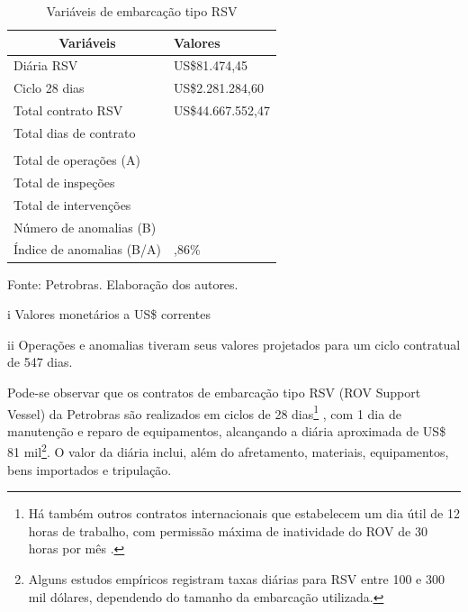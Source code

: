 \begin{table}[h]
	\centering
	\begin{threeparttable}
	\centering
	\caption{Variáveis de embarcação tipo RSV}
	\label{tab:cost1}
	\begin{tabular}{p{8cm} >{\centering\arraybackslash}m{3.7cm}}
		\hline
		\multicolumn{1}{c}{\textbf{Variáveis}} & \textbf{Valores}\tnote{i}  \\ \hline
		Diária RSV                              & US\$81.474,45     \\
		Ciclo 28 dias                          & US\$2.281.284,60  \\
		Total contrato RSV                     & US\$44.667.552,47 \\
		Total dias de contrato                 & 547               \\
		                                       &                   \\
		Total de operações (A)\tnote{ii}       & 1976              \\
		Total de inspeções                     & 1337              \\
		Total de intervenções                  & 639               \\
		Número de anomalias (B)                & 432               \\
		Índice de anomalias (B/A)              & 21,86\%           \\ \hline
	\end{tabular}
\begin{tablenotes}
\item Fonte: Petrobras. Elaboração dos autores.
\item[i]{Valores monetários a US\$ correntes}
\item[ii]{Operações e anomalias tiveram seus valores projetados para um ciclo contratual de 547 dias.}
\end{tablenotes}
\end{threeparttable}
\end{table}


Pode-se observar que os contratos de embarcação tipo RSV (ROV Support Vessel) da Petrobras são realizados em ciclos de 28 dias\footnote{Há também outros contratos internacionais que estabelecem um dia útil de 12 horas de trabalho, com permissão máxima de inatividade do ROV de 30 horas por mês \cite{kaiser2019role}.} , com 1 dia de manutenção e reparo de equipamentos, alcançando a diária aproximada de US\$ 81 mil\footnote{Alguns estudos empíricos registram taxas diárias para RSV entre 100 e 300 mil dólares, dependendo do tamanho da embarcação utilizada.}. O valor da diária inclui, além do afretamento, materiais, equipamentos, bens importados e tripulação. 

